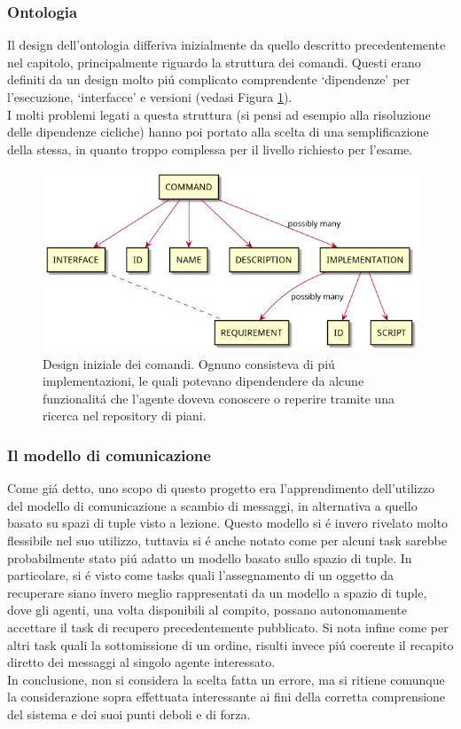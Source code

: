 \subsubsection{Ontologia}
Il design dell'ontologia differiva inizialmente da quello descritto precedentemente nel capitolo, principalmente riguardo la struttura dei comandi. Questi erano definiti da un design molto pi\'u complicato comprendente `dipendenze' per l'esecuzione, `interfacce' e versioni (vedasi Figura \ref{fig:ontology-old-commands}).\\
I molti problemi legati a questa struttura (si pensi ad esempio alla risoluzione delle dipendenze cicliche) hanno poi portato alla scelta di una semplificazione della stessa, in quanto troppo complessa per il livello richiesto per l'esame.
\begin{figure}[!ht]\centering
    \includegraphics[width=\textwidth]{section/design/figure/ontology/ontology-old-commands.png}
    \caption{Design iniziale dei comandi. Ognuno consisteva di pi\'u implementazioni, le quali potevano dipendendere da alcune funzionalit\'a che l'agente doveva conoscere o reperire tramite una ricerca nel repository di piani.}
    \label{fig:ontology-old-commands}
\end{figure}
%
\subsubsection{Il modello di comunicazione}
Come gi\'a detto, uno scopo di questo progetto era l'apprendimento dell'utilizzo del modello di comunicazione a scambio di messaggi, in alternativa a quello basato su spazi di tuple visto a lezione. Questo modello si \'e invero rivelato molto flessibile nel suo utilizzo, tuttavia si \'e anche notato come per alcuni task sarebbe probabilmente stato pi\'u adatto un modello basato sullo spazio di tuple. In particolare, si \'e visto come tasks quali l'assegnamento di un oggetto da recuperare siano invero meglio rappresentati da un modello a spazio di tuple, dove gli agenti, una volta disponibili al compito, possano autonomamente accettare il task di recupero precedentemente pubblicato. Si nota infine come per altri task quali la sottomissione di un ordine, risulti invece pi\'u coerente il recapito diretto dei messaggi al singolo agente interessato.\\
In conclusione, non si considera la scelta fatta un errore, ma si ritiene comunque la considerazione sopra effettuata interessante ai fini della corretta comprensione del sistema e dei suoi punti deboli e di forza.
